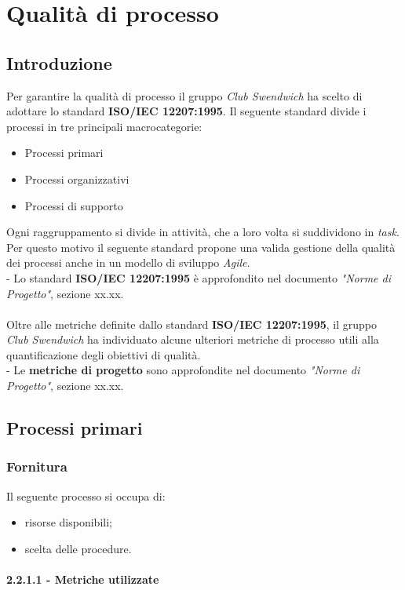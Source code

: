 \section{Qualità di processo}
\subsection{Introduzione}
Per garantire la qualità di processo il gruppo \textit{Club Swendwich} 
ha scelto di adottare lo standard \textbf{ISO/IEC 12207:1995}.
Il seguente standard divide i processi in tre principali macrocategorie:
\begin{itemize}
    \item Processi primari
    \item Processi organizzativi
    \item Processi di supporto
\end{itemize}
Ogni raggruppamento si divide in attività, che a loro volta si suddividono
in \textit{task}.\\
Per questo motivo il seguente standard propone una valida gestione della
qualità dei processi anche in un modello di sviluppo \textit{Agile}.\\
\noindent
- Lo standard \textbf{ISO/IEC 12207:1995} è approfondito nel documento \textit{"Norme di Progetto"},
sezione xx.xx. \\
\\
\noindent
Oltre alle metriche definite dallo standard \textbf{ISO/IEC 12207:1995}, il 
gruppo \textit{Club Swendwich} ha individuato alcune ulteriori metriche
di processo utili alla quantificazione degli obiettivi di qualità.\\
\noindent
- Le \textbf{metriche di progetto} sono approfondite nel documento \textit{"Norme di Progetto"},
sezione xx.xx.

\subsection{Processi primari}
\subsubsection{Fornitura}
Il seguente processo si occupa di:
\begin{itemize}
    \item risorse disponibili;
    \item scelta delle procedure.
\end{itemize}
\paragraph{2.2.1.1 - Metriche utilizzate}

